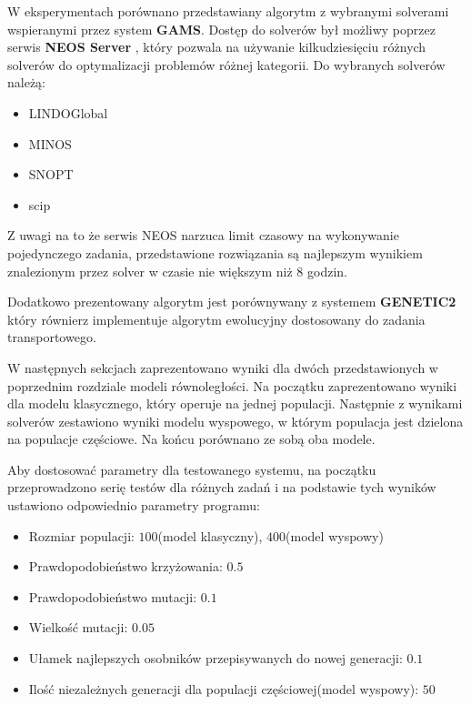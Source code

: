 W eksperymentach porównano przedstawiany algorytm z wybranymi solverami wspieranymi przez system \textbf{GAMS}. Dostęp do solverów był możliwy poprzez serwis 
\textbf{NEOS Server} \cite{NEOS-1,NEOS-2,NEOS-3}, który pozwala na używanie kilkudziesięciu różnych solverów do optymalizacji problemów różnej kategorii. Do wybranych 
solverów należą:

\begin{itemize}
    \item LINDOGlobal
    \item MINOS
    \item SNOPT
    \item scip
\end{itemize}

Z uwagi na to że serwis NEOS narzuca limit czasowy na wykonywanie pojedynczego zadania, przedstawione rozwiązania są najlepszym wynikiem znalezionym 
przez solver w czasie nie większym niż 8 godzin.

Dodatkowo prezentowany algorytm jest porównywany z systemem \textbf{GENETIC2}\cite{ALG-GEN-BOOK} który równierz implementuje algorytm ewolucyjny 
dostosowany do zadania transportowego.

W następnych sekcjach zaprezentowano wyniki dla dwóch przedstawionych w poprzednim rozdziale modeli równoległości. Na początku zaprezentowano wyniki 
dla modelu klasycznego, który operuje na jednej populacji. Następnie z wynikami solverów zestawiono wyniki modelu wyspowego, w którym 
populacja jest dzielona na populacje częściowe. Na końcu porównano ze sobą oba modele.

Aby dostosować parametry dla testowanego systemu, na początku przeprowadzono serię testów dla różnych zadań i na podstawie tych wyników ustawiono 
odpowiednio parametry programu:

\begin{itemize}
    \item Rozmiar populacji: $100$(model klasyczny), $400$(model wyspowy)
    \item Prawdopodobieństwo krzyżowania: $0.5$
    \item Prawdopodobieństwo mutacji: $0.1$
    \item Wielkość mutacji: $0.05$
    \item Ułamek najlepszych osobników przepisywanych do nowej generacji: $0.1$
    \item Ilość niezależnych generacji dla populacji częściowej(model wyspowy): $50$
\end{itemize}


